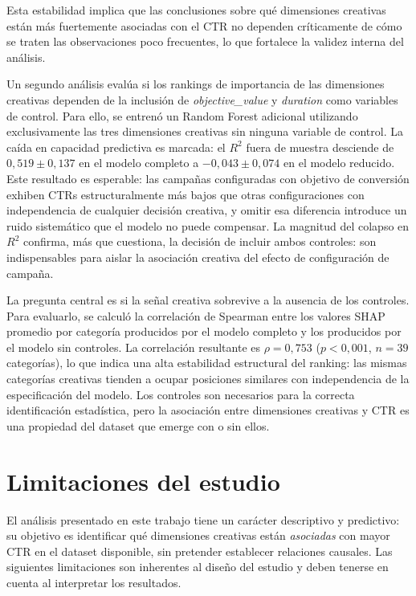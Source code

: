 \documentclass[12pt, a4paper]{report}
\begin{document}
Esta estabilidad implica que las conclusiones sobre qué dimensiones creativas están más
fuertemente asociadas con el CTR no dependen críticamente de cómo se traten las observaciones
poco frecuentes, lo que fortalece la validez interna del análisis.

Un segundo análisis evalúa si los rankings de importancia de las dimensiones creativas
dependen de la inclusión de \textit{objective\_value} y \textit{duration} como variables
de control. Para ello, se entrenó un Random Forest adicional utilizando exclusivamente las
tres dimensiones creativas sin ninguna variable de control. La caída en capacidad
predictiva es marcada: el $R^2$ fuera de muestra desciende de $0{,}519 \pm 0{,}137$
en el modelo completo a $-0{,}043 \pm 0{,}074$ en el modelo reducido. Este resultado
es esperable: las campañas configuradas con objetivo de conversión exhiben CTRs
estructuralmente más bajos que otras configuraciones con independencia de cualquier
decisión creativa, y omitir esa diferencia introduce un ruido sistemático que el modelo
no puede compensar. La magnitud del colapso en $R^2$ confirma, más que cuestiona, la
decisión de incluir ambos controles: son indispensables para aislar la asociación creativa
del efecto de configuración de campaña.

La pregunta central es si la señal creativa sobrevive a la ausencia de los controles.
Para evaluarlo, se calculó la correlación de Spearman entre los valores SHAP promedio
por categoría producidos por el modelo completo y los producidos por el modelo sin
controles. La correlación resultante es $\rho = 0{,}753$ ($p < 0{,}001$,
$n = 39$ categorías), lo que indica una alta estabilidad estructural del ranking: las
mismas categorías creativas tienden a ocupar posiciones similares con independencia de la
especificación del modelo. Los controles son necesarios para la correcta identificación
estadística, pero la asociación entre dimensiones creativas y CTR es una propiedad del
dataset que emerge con o sin ellos.

\section{Limitaciones del estudio}

El análisis presentado en este trabajo tiene un carácter descriptivo y predictivo:
su objetivo es identificar qué dimensiones creativas están \textit{asociadas} con
mayor CTR en el dataset disponible, sin pretender establecer relaciones causales.
Las siguientes limitaciones son inherentes al diseño del estudio y deben tenerse
en cuenta al interpretar los resultados.
\end{document}
